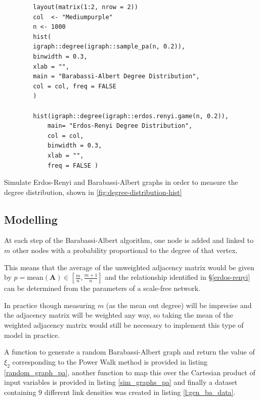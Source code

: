 \documentclass[11pt]{report}
\begin{document}


\begin{listing}[htbp]
    \begin{tcolorbox}
        \begin{verbatim}
        layout(matrix(1:2, nrow = 2))
        col  <- "Mediumpurple"
        n <- 1000
        hist(
        igraph::degree(igraph::sample_pa(n, 0.2)),
        binwidth = 0.3,
        xlab = "",
        main = "Barabassi-Albert Degree Distribution",
        col = col, freq = FALSE
        )

        hist(igraph::degree(igraph::erdos.renyi.game(n, 0.2)),
            main= "Erdos-Renyi Degree Distribution",
            col = col,
            binwidth = 0.3,
            xlab = "",
            freq = FALSE )
        \end{verbatim}
    \end{tcolorbox}
\caption{\label{degree-distribution-hist}Simulate Erdos-Renyi and Barabassi-Albert graphs in order to measure the degree distribution,  shown in \ref{fig:degree-distribution-hist}}
\end{listing}



\subsection{Modelling}
\label{sec:orgb52cc3e}
At each step of the Barabassi-Albert algorithm, one node is added and linked to \(m\) other nodes with a probability proportional to the degree of that vertex.

This means that the average of the unweighted adjacency matrix would be given by \(p = \mathrm{mean}\left(\mathbf{A}\right) \in \left[ \frac{m}{n}, \frac{m+1}{n} \right]\) and the relationship identified in  \S \ref{erdos-renyi} can be determined from the parameters of a scale-free network.

In practice though measuring \(m\) (as the mean out degree) will be imprecise and the adjacency matrix will be weighted any way, so taking the mean of the weighted adjacency matrix would still be necessary to implement this type of model in practice.

A function to generate a random Barabassi-Albert graph and return the value of
\(\xi_{2}\) corresponding to the Power Walk method is provided in listing
\ref{random_graph_pa}, another function to map this over the Cartesian product of
input variables is provided in listing \ref{sim_graphs_pa} and finally a dataset containing 9
different link densities was created in listing \ref{l:gen_ba_data}.
\end{document}
